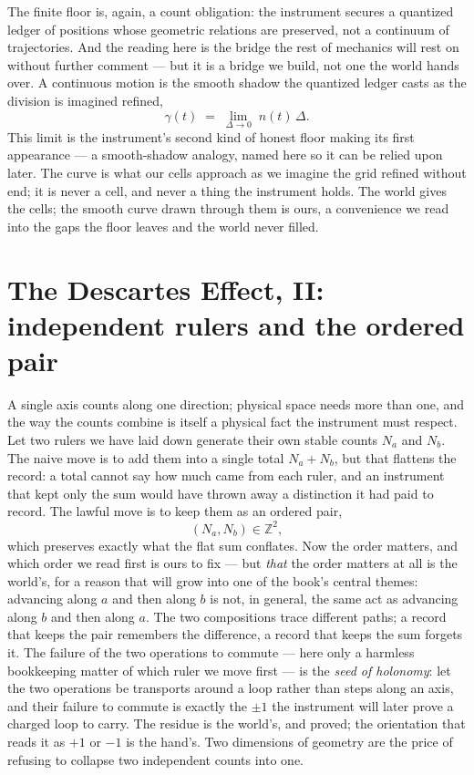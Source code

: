 The finite floor is, again, a count obligation: the instrument secures a quantized ledger of positions whose
geometric relations are preserved, not a continuum of trajectories. And the reading here is the bridge the
rest of mechanics will rest on without further comment --- but it is a bridge we build, not one the world hands
over. A continuous motion is the smooth shadow the quantized ledger casts as the division is imagined refined,
\begin{equation}
  \gamma(t) \;=\; \lim_{\Delta \to 0}\; n(t)\,\Delta .
\end{equation}
This limit is the instrument's second kind of honest floor making its first appearance --- a smooth-shadow
analogy, named here so it can be relied upon later. The curve is what our cells approach as we imagine the grid
refined without end; it is never a cell, and never a thing the instrument holds. The world gives the cells; the
smooth curve drawn through them is ours, a convenience we read into the gaps the floor leaves and the world
never filled.

\section{The Descartes Effect, II: independent rulers and the ordered pair}
\label{se:descartes-ii}

A single axis counts along one direction; physical space needs more than one, and the way the counts combine
is itself a physical fact the instrument must respect. Let two rulers we have laid down generate their own
stable counts $N_a$ and $N_b$. The naive move is to add them into a single total $N_a + N_b$, but that
flattens the record: a total cannot say how much came from each ruler, and an instrument that kept only the
sum would have thrown away a distinction it had paid to record. The lawful move is to keep them as an ordered
pair,
\begin{equation}
  (N_a, N_b) \in \mathbb{Z}^2,
\end{equation}
which preserves exactly what the flat sum conflates. Now the order matters, and which order we read first is
ours to fix --- but \emph{that} the order matters at all is the world's, for a reason that will grow into one
of the book's central themes: advancing along $a$ and then along $b$ is not, in general, the same act as
advancing along $b$ and then along $a$. The two compositions trace different paths; a record that keeps the
pair remembers the difference, a record that keeps the sum forgets it. The failure of the two operations to
commute --- here only a harmless bookkeeping matter of which ruler we move first --- is the \emph{seed of
holonomy}: let the two operations be transports around a loop rather than steps along an axis, and their
failure to commute is exactly the $\pm 1$ the instrument will later prove a charged loop to carry. The residue
is the world's, and proved; the orientation that reads it as $+1$ or $-1$ is the hand's. Two dimensions of
geometry are the price of refusing to collapse two independent counts into one.


